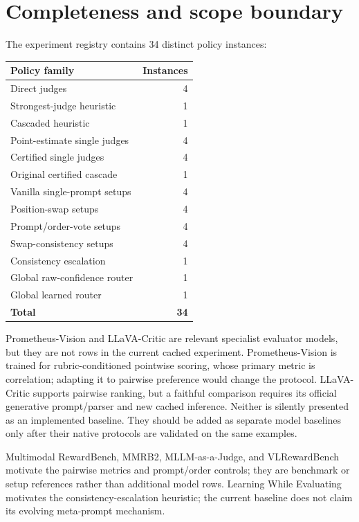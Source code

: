 \documentclass[10pt]{article}
\begin{document}
\section{Completeness and scope boundary}

The experiment registry contains 34 distinct policy instances:

\begin{center}
\begin{tabular}{@{}lr@{}}
\toprule
\textbf{Policy family} & \textbf{Instances} \\
\midrule
Direct judges & 4 \\
Strongest-judge heuristic & 1 \\
Cascaded heuristic & 1 \\
Point-estimate single judges & 4 \\
Certified single judges & 4 \\
Original certified cascade & 1 \\
Vanilla single-prompt setups & 4 \\
Position-swap setups & 4 \\
Prompt/order-vote setups & 4 \\
Swap-consistency setups & 4 \\
Consistency escalation & 1 \\
Global raw-confidence router & 1 \\
Global learned router & 1 \\
\midrule
\textbf{Total} & \textbf{34} \\
\bottomrule
\end{tabular}
\end{center}

Prometheus-Vision \cite{lee2024prometheusvision} and LLaVA-Critic
\cite{xiong2024llavacritic} are relevant specialist evaluator models, but they are not rows
in the current cached experiment. Prometheus-Vision is trained for rubric-conditioned
pointwise scoring, whose primary metric is correlation; adapting it to pairwise preference
would change the protocol. LLaVA-Critic supports pairwise ranking, but a faithful comparison
requires its official generative prompt/parser and new cached inference. Neither is silently
presented as an implemented baseline. They should be added as separate model baselines only
after their native protocols are validated on the same examples.

Multimodal RewardBench, MMRB2, MLLM-as-a-Judge, and VLRewardBench motivate the pairwise
metrics and prompt/order controls; they are benchmark or setup references rather than
additional model rows. Learning While Evaluating motivates the consistency-escalation
heuristic; the current baseline does not claim its evolving meta-prompt mechanism.
\end{document}
